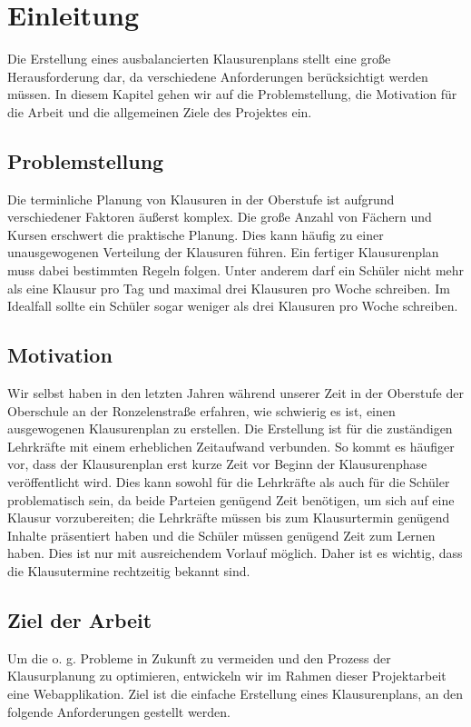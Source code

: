 \newpage
\section{Einleitung}
Die Erstellung eines ausbalancierten Klausurenplans stellt eine große Herausforderung dar, da verschiedene Anforderungen berücksichtigt werden müssen. In diesem Kapitel gehen wir auf die Problemstellung, die Motivation für die Arbeit und die allgemeinen Ziele des Projektes ein.

\subsection{Problemstellung}
Die terminliche Planung von Klausuren in der Oberstufe ist aufgrund verschiedener Faktoren äußerst komplex. Die große Anzahl von Fächern und Kursen erschwert die praktische Planung.
Dies kann häufig zu einer unausgewogenen Verteilung der Klausuren führen. Ein fertiger Klausurenplan muss dabei bestimmten Regeln folgen. Unter anderem darf ein Schüler nicht mehr als eine Klausur pro Tag und maximal drei Klausuren pro Woche schreiben. Im Idealfall sollte ein Schüler sogar weniger als drei Klausuren pro Woche schreiben.

\subsection{Motivation}
Wir selbst haben in den letzten Jahren während unserer Zeit in der Oberstufe der Oberschule an der Ronzelenstraße erfahren, wie schwierig es ist, einen ausgewogenen Klausurenplan zu erstellen. Die Erstellung ist für die zuständigen Lehrkräfte mit einem erheblichen Zeitaufwand verbunden. So kommt es häufiger vor, dass der Klausurenplan erst kurze Zeit vor Beginn der Klausurenphase veröffentlicht wird. Dies kann sowohl für die Lehrkräfte als auch für die Schüler problematisch sein, da beide Parteien genügend Zeit benötigen, um sich auf eine Klausur vorzubereiten; die Lehrkräfte müssen bis zum Klausurtermin genügend Inhalte präsentiert haben und die Schüler müssen genügend Zeit zum Lernen haben. Dies ist nur mit ausreichendem Vorlauf möglich. Daher ist es wichtig, dass die Klausutermine rechtzeitig bekannt sind.

\subsection{Ziel der Arbeit}
Um die \acrshort{o. g.} Probleme in Zukunft zu vermeiden und den Prozess der Klausurplanung zu optimieren, entwickeln wir im Rahmen dieser Projektarbeit eine Webapplikation. Ziel ist die einfache Erstellung eines Klausurenplans, an den folgende Anforderungen gestellt werden.

